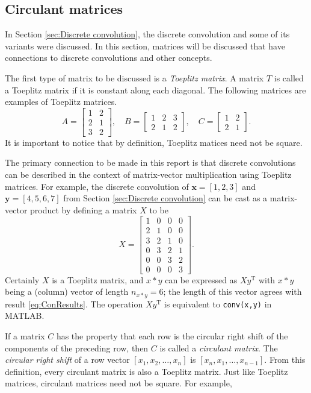 \documentclass[12pt]{article}
\newcommand{\trans}{\mathrm{T}}	%
\begin{document}
\subsection{Circulant matrices} \label{sec:Circulant matrices}
In Section \ref{sec:Discrete convolution}, the discrete convolution and some of its variants were discussed. In this section, matrices will be discussed that have connections to discrete convolutions and other concepts. \par 
The first type of matrix to be discussed is a \textit{Toeplitz matrix}. A matrix $T$ is called a Toeplitz matrix if it is constant along each diagonal. The following matrices are examples of Toeplitz matrices.
\[A = \begin{bmatrix}
1 & 2 \\
2 & 1 \\
3 & 2
\end{bmatrix}, \quad 
B = \begin{bmatrix}
1 & 2 & 3 \\
2 & 1 & 2 
\end{bmatrix}, \quad 
C = \begin{bmatrix}
1 &  2 \\
2 & 1
\end{bmatrix}.\]
It is important to notice that by definition, Toeplitz matices need not be square. \par 
The primary connection to be made in this report is that discrete convolutions can be described in the context of matrix-vector multiplication using Toeplitz matrices. For example, the discrete convolution of $\mathbf{x} = [1,2,3]$ and $\mathbf{y} = [4,5,6,7]$ from Section \ref{sec:Discrete convolution} can be cast as a matrix-vector product by defining a matrix $X$ to be
\[X = \begin{bmatrix}
1 & 0 & 0 & 0 \\
2 & 1 & 0 & 0 \\
3 & 2 & 1 & 0 \\
0 & 3 & 2 & 1 \\
0 & 0 & 3 & 2 \\
0 & 0 & 0 & 3
\end{bmatrix}.\]
Certainly $X$ is a Toeplitz matrix, and $x*y$ can be expressed as $Xy^\trans$ with $x*y$ being a (column) vector of length $n_{x*y} = 6$; the length of this vector agrees with result \eqref{eq:ConResults}. The operation $Xy^\trans$ is equivalent to \texttt{conv(x,y)} in MATLAB. \par 
If a matrix $C$ has the property that each row is the circular right shift of the components of the preceding row, then $C$ is called a \textit{circulant matrix}. The \textit{circular right shift} of a row vector $[x_1,x_2,\ldots,x_n]$ is $[x_n,x_1,\ldots,x_{n-1}]$. From this definition, every circulant matrix is also a Toeplitz matrix. Just like Toeplitz matrices, circulant matrices need not be square. For example,
\end{document}
